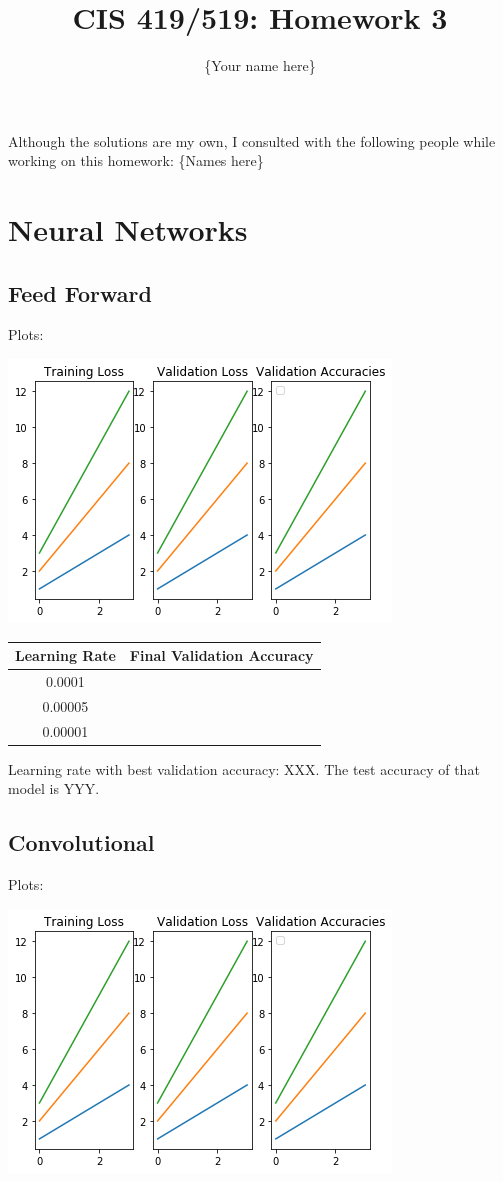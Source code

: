 \documentclass{article}
\title{CIS 419/519: Homework 3}
\author{\{Your name here\}}
\date{}
\begin{document}
\maketitle
    Although the solutions are my own, I consulted with the following people while working on this homework: \{Names here\} \\
    
\section*{Neural Networks}
\subsection*{Feed Forward}
Plots:
\begin{center}
    \includegraphics{example-plot.png}
\end{center}

\begin{center}
    \begin{tabular}{|c|c|}
        \hline
        Learning Rate & Final Validation Accuracy \\
        \hline
        0.0001 & \\
        0.00005 & \\
        0.00001 & \\
        \hline
    \end{tabular}
\end{center}
Learning rate with best validation accuracy: XXX.
The test accuracy of that model is YYY.

\subsection*{Convolutional}
Plots:
\begin{center}
    \includegraphics{example-plot.png}
\end{center}
\end{document}
